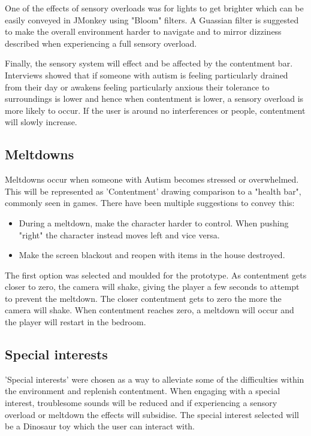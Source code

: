 \documentclass[11pt]{report}
\begin{document}
One of the effects of sensory overloads was for lights to get brighter which can be easily conveyed in JMonkey using "Bloom" filters. A Guassian filter is suggested to make the overall environment harder to navigate and to mirror dizziness described when experiencing a full sensory overload. 

Finally, the sensory system will effect and be affected by the contentment bar. Interviews showed that if someone with autism is feeling particularly drained from their day or awakens feeling particularly anxious their tolerance to surroundings is lower and hence when contentment is lower, a sensory overload is more likely to occur. If the user is around no interferences or people, contentment will slowly increase. 

\subsection{Meltdowns}
Meltdowns occur when someone with Autism becomes stressed or overwhelmed. This will be represented as 'Contentment' drawing comparison to a "health bar", commonly seen in games. There have been multiple suggestions to convey this:

\begin{itemize}
\item During a meltdown, make the character harder to control. When pushing "right" the character instead moves left and vice versa.
\item Make the screen blackout and reopen with items in the house destroyed.
\end{itemize}

The first option was selected and moulded for the prototype. As contentment gets closer to zero, the camera will shake, giving the player a few seconds to attempt to prevent the meltdown. The closer contentment gets to zero the more the camera will shake. When contentment reaches zero, a meltdown will occur and the player will restart in the bedroom. 

\subsection{Special interests}
'Special interests' were chosen as a way to alleviate some of the difficulties within the environment and replenish contentment. When engaging with a special interest, troublesome sounds will be reduced and if experiencing a sensory overload or meltdown the effects will subsidise. The special interest selected will be a Dinosaur toy which the user can interact with.
\end{document}
